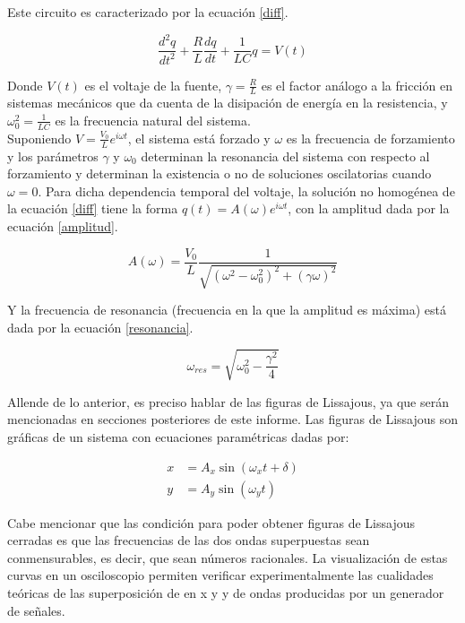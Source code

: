 \documentclass[prb,aps,twocolumn,preprintnumbers,amsmath,amssymb]{revtex4}
\begin{document}
Este circuito es caracterizado por la ecuación \eqref{diff}.

\begin{equation}
\label{diff}
\frac{d^2 q}{d t^2} + \frac{R}{L}\frac{d q}{d t} + \frac{1}{LC}q = V(t)
\end{equation}

Donde $V(t)$ es el voltaje de la fuente, $\gamma = \frac{R}{L}$ es el factor análogo a la fricción en sistemas mecánicos que da cuenta de la disipación de energía en la resistencia, y $\omega_{0}^2 = \frac{1}{LC}$ es la frecuencia natural del sistema.\\

Suponiendo $V = \frac{V_{0}}{L} e^{i\omega t}$, el sistema está forzado y $\omega$ es la frecuencia de forzamiento y los parámetros $\gamma$ y $\omega_{0}$ determinan la resonancia del sistema con respecto al forzamiento  y determinan la existencia o no de soluciones oscilatorias cuando $\omega = 0$. Para dicha dependencia temporal del voltaje, la solución no homogénea de la ecuación \eqref{diff} tiene la forma $q(t) = A(\omega) e^{i \omega t}$, con la amplitud dada por la ecuación \eqref{amplitud}.

\begin{equation}
\label{amplitud}
A(\omega) = \frac{V_{0}}{L}\frac{1}{\sqrt{(\omega^2 - \omega_{0}^2)^2+(\gamma \omega)^2}}
\end{equation}

Y la frecuencia de resonancia (frecuencia en la que la amplitud es máxima) está dada por la ecuación \eqref{resonancia}.

\begin{equation}
\label{resonancia}
\omega_{res} = \sqrt{\omega_{0}^2 - \frac{\gamma^2}{4}}
\end{equation}

Allende de lo anterior, es preciso hablar de las figuras de Lissajous, ya que serán mencionadas en secciones posteriores de este informe. Las figuras de Lissajous son gráficas de un sistema con ecuaciones paramétricas dadas por:

\begin{equation}
\label{lissa}
\begin{split}
x &= A_{x}\sin(\omega_{x}t + \delta)\\
y &= A_{y}\sin(\omega_{y}t)
\end{split}
\end{equation}

Cabe mencionar que las condición para poder obtener figuras de Lissajous cerradas es que las frecuencias de las dos ondas superpuestas sean conmensurables, es decir, que sean números racionales. La visualización de estas curvas en un osciloscopio permiten verificar experimentalmente las cualidades teóricas de las superposición de en x y y de ondas producidas por un generador de señales.
\end{document}
